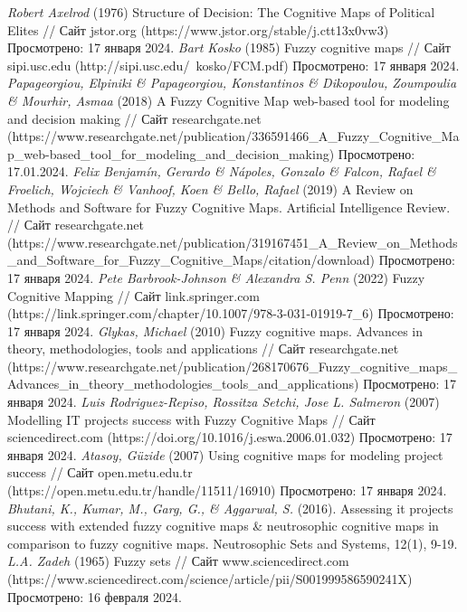 \documentclass{article}
\begin{document}
\begin{thebibliography}{}
         \textit{Robert Axelrod} (1976) Structure of Decision: The Cognitive Maps of Political Elites // Сайт jstor.org (https://www.jstor.org/stable/j.ctt13x0vw3) Просмотрено: 17 января 2024.
         \textit{Bart Kosko} (1985) Fuzzy cognitive maps // Сайт sipi.usc.edu (http://sipi.usc.edu/~kosko/FCM.pdf) Просмотрено: 17 января 2024.
         \textit{Papageorgiou, Elpiniki \& Papageorgiou, Konstantinos \& Dikopoulou, Zoumpoulia \& Mourhir, Asmaa} (2018) A Fuzzy Cognitive Map web-based tool for modeling and decision making // Сайт researchgate.net (https://www.researchgate.net/publication/336591466\_A\_Fuzzy\_Cognitive\_Map\_web-based\_tool\_for\_modeling\_and\_decision\_making) Просмотрено: 17.01.2024.
         \textit{Felix Benjamín, Gerardo \& Nápoles, Gonzalo \& Falcon, Rafael \& Froelich, Wojciech \& Vanhoof, Koen \& Bello, Rafael} (2019) A Review on Methods and Software for Fuzzy Cognitive Maps. Artificial Intelligence Review. // Сайт researchgate.net (https://www.researchgate.net/publication/319167451\_A\_Review\_on\_Methods\_and\_Software\_for\_Fuzzy\_Cognitive\_Maps/citation/download) Просмотрено: 17 января 2024.
         \textit{Pete Barbrook-Johnson \& Alexandra S. Penn} (2022) Fuzzy Cognitive Mapping // Сайт link.springer.com (https://link.springer.com/chapter/10.1007/978-3-031-01919-7\_6) Просмотрено: 17 января 2024.
         \textit{Glykas, Michael} (2010) Fuzzy cognitive maps. Advances in theory, methodologies, tools and applications // Сайт researchgate.net (https://www.researchgate.net/publication/268170676\_Fuzzy\_cognitive\_maps\_Advances\_in\_theory\_methodologies\_tools\_and\_applications) Просмотрено: 17 января 2024.
         \textit{Luis Rodriguez-Repiso, Rossitza Setchi, Jose L. Salmeron} (2007) Modelling IT projects success with Fuzzy Cognitive Maps // Сайт sciencedirect.com (https://doi.org/10.1016/j.eswa.2006.01.032) Просмотрено: 17 января 2024.
         \textit{Atasoy, Güzide} (2007) Using cognitive maps for modeling project success // Сайт open.metu.edu.tr (https://open.metu.edu.tr/handle/11511/16910) Просмотрено: 17 января 2024.
         \textit{Bhutani, K., Kumar, M., Garg, G., \& Aggarwal, S.} (2016). Assessing it projects success with extended fuzzy cognitive maps \& neutrosophic cognitive maps in comparison to fuzzy cognitive maps. Neutrosophic Sets and Systems, 12(1), 9-19.
         \textit{L.A. Zadeh} (1965) Fuzzy sets // Сайт www.sciencedirect.com (https://www.sciencedirect.com/science/article/pii/S001999586590241X) Просмотрено: 16 февраля 2024.

\end{thebibliography}
\end{document}
